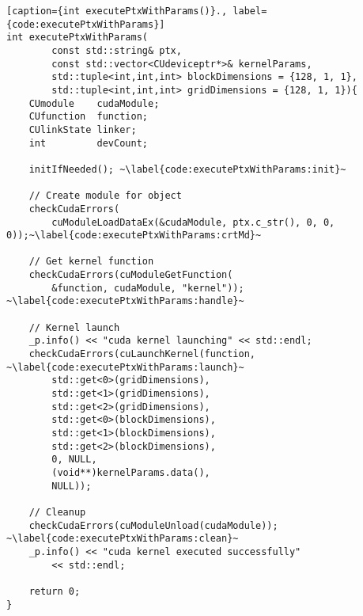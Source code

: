 \begin{lstlisting}[caption={int executePtxWithParams()}., label={code:executePtxWithParams}]
int executePtxWithParams(
        const std::string& ptx, 
        const std::vector<CUdeviceptr*>& kernelParams, 
        std::tuple<int,int,int> blockDimensions = {128, 1, 1}, 
        std::tuple<int,int,int> gridDimensions = {128, 1, 1}){
    CUmodule    cudaModule;
    CUfunction  function;
    CUlinkState linker;
    int         devCount;

    initIfNeeded(); ~\label{code:executePtxWithParams:init}~

    // Create module for object
    checkCudaErrors(
        cuModuleLoadDataEx(&cudaModule, ptx.c_str(), 0, 0, 0));~\label{code:executePtxWithParams:crtMd}~

    // Get kernel function
    checkCudaErrors(cuModuleGetFunction(
        &function, cudaModule, "kernel")); ~\label{code:executePtxWithParams:handle}~

    // Kernel launch
    _p.info() << "cuda kernel launching" << std::endl;
    checkCudaErrors(cuLaunchKernel(function, ~\label{code:executePtxWithParams:launch}~
        std::get<0>(gridDimensions), 
        std::get<1>(gridDimensions), 
        std::get<2>(gridDimensions),
        std::get<0>(blockDimensions), 
        std::get<1>(blockDimensions), 
        std::get<2>(blockDimensions),
        0, NULL, 
        (void**)kernelParams.data(), 
        NULL));

    // Cleanup
    checkCudaErrors(cuModuleUnload(cudaModule)); ~\label{code:executePtxWithParams:clean}~
    _p.info() << "cuda kernel executed successfully" 
        << std::endl;

    return 0;
}
\end{lstlisting}
